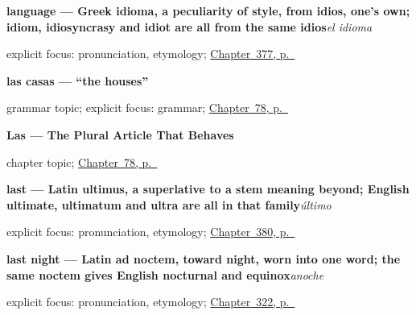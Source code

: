\noindent\begin{minipage}[t]{\linewidth}
\raggedright
\textbf{language — Greek idioma, a peculiarity of style, from idios, one's own; idiom, idiosyncrasy and idiot are all from the same idios}\enspace\emph{el idioma}\par
\footnotesize explicit focus: pronunciation, etymology; \hyperref[ch:la-letra-y-la-frase]{Chapter~377, p.~\pageref*{ch:la-letra-y-la-frase}}
\end{minipage}\par\smallskip

\noindent\begin{minipage}[t]{\linewidth}
\raggedright
\textbf{las casas — \textquotedblleft{}the houses\textquotedblright{}}\par
\footnotesize grammar topic; explicit focus: grammar; \hyperref[ch:articles-las]{Chapter~78, p.~\pageref*{ch:articles-las}}
\end{minipage}\par\smallskip

\noindent\begin{minipage}[t]{\linewidth}
\raggedright
\textbf{Las --- The Plural Article That Behaves}\par
\footnotesize chapter topic; \hyperref[ch:articles-las]{Chapter~78, p.~\pageref*{ch:articles-las}}
\end{minipage}\par\smallskip

\noindent\begin{minipage}[t]{\linewidth}
\raggedright
\textbf{last — Latin ultimus, a superlative to a stem meaning beyond; English ultimate, ultimatum and ultra are all in that family}\enspace\emph{último}\par
\footnotesize explicit focus: pronunciation, etymology; \hyperref[ch:simpatico-y-alegre]{Chapter~380, p.~\pageref*{ch:simpatico-y-alegre}}
\end{minipage}\par\smallskip

\noindent\begin{minipage}[t]{\linewidth}
\raggedright
\textbf{last night — Latin ad noctem, toward night, worn into one word; the same noctem gives English nocturnal and equinox}\enspace\emph{anoche}\par
\footnotesize explicit focus: pronunciation, etymology; \hyperref[ch:anoche-y-todavia]{Chapter~322, p.~\pageref*{ch:anoche-y-todavia}}
\end{minipage}\par\smallskip

